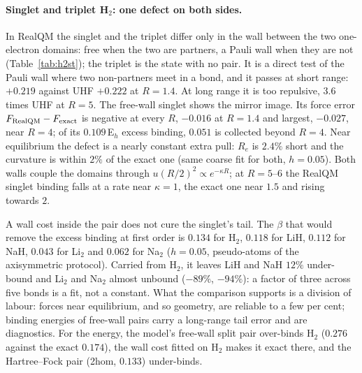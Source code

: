 \documentclass[11pt]{article}
\begin{document}
\paragraph{Singlet and triplet H$_2$: one defect on both sides.}
In RealQM the singlet and the triplet differ only in the wall between the two one-electron domains:
free when the two are partners, a Pauli wall when they are not (Table~\ref{tab:h2st}); the triplet is the state
with no pair. It is a direct test of the Pauli wall where two non-partners meet in a bond, and it passes at short range: $+0.219$ against
UHF $+0.222$ at $R=1.4$. At long range it is too repulsive, $3.6$ times UHF at $R=5$. The free-wall
singlet shows the mirror image. Its force error $F_{\rm RealQM}-F_{\rm exact}$ is negative at every $R$,
$-0.016$ at $R=1.4$ and largest, $-0.027$, near $R=4$; of its $0.109$\,E$_h$ excess binding, $0.051$ is
collected beyond $R=4$. Near equilibrium the defect is a nearly constant extra pull: $R_e$ is $2.4\%$ short
and the curvature is within $2\%$ of the exact one (same coarse fit for both, $h=0.05$). Both walls couple
the domains through $u(R/2)^2\propto e^{-\kappa R}$; at $R=5$--$6$ the RealQM singlet binding falls at a
rate near $\kappa=1$, the exact one near $1.5$ and rising towards $2$.

A wall cost inside the pair does not cure the singlet's tail. The $\beta$ that would remove the excess
binding at first order is $0.134$ for H$_2$, $0.118$ for LiH, $0.112$ for NaH, $0.043$ for Li$_2$ and
$0.062$ for Na$_2$ ($h=0.05$, pseudo-atoms of the axisymmetric protocol). Carried from H$_2$, it leaves
LiH and NaH $12\%$ under-bound and Li$_2$ and Na$_2$ almost unbound ($-89\%$, $-94\%$): a factor of three
across five bonds is a fit, not a constant. What the comparison supports is a division of labour: forces
near equilibrium, and so geometry, are reliable to a few per cent; binding energies of free-wall pairs carry
a long-range tail error and are diagnostics. For the energy, the model's free-wall split pair over-binds H$_2$ ($0.276$ against the exact $0.174$), the wall
cost fitted on H$_2$ makes it exact there, and the Hartree--Fock pair (2hom, $0.133$) under-binds.
\end{document}
